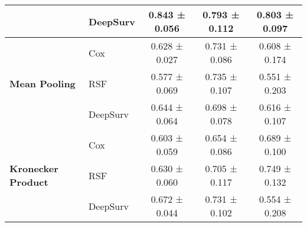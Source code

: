 \begin{sidewaystable}[htbp]
\begin{tabular}{@{}llccc@{}}
        & DeepSurv & 0.843 ± 0.056 & 0.793 ± 0.112 & 0.803 ± 0.097 \\
        \midrule
        \multirow{3}{*}{\textbf{Mean Pooling}} & Cox & 0.628 ± 0.027 & 0.731 ± 0.086 & 0.608 ± 0.174 \\
        & RSF & 0.577 ± 0.069 & 0.735 ± 0.107 & 0.551 ± 0.203 \\
        & DeepSurv & 0.644 ± 0.064 & 0.698 ± 0.078 & 0.616 ± 0.107 \\
        \midrule
        \multirow{3}{*}{\textbf{Kronecker Product}} & Cox & 0.603 ± 0.059 & 0.654 ± 0.086 & 0.689 ± 0.100 \\
        & RSF & 0.630 ± 0.060 & 0.705 ± 0.117 & 0.749 ± 0.132 \\
        & DeepSurv & 0.672 ± 0.044 & 0.731 ± 0.102 & 0.554 ± 0.208 \\
        \bottomrule
    \end{tabular}
\end{sidewaystable}